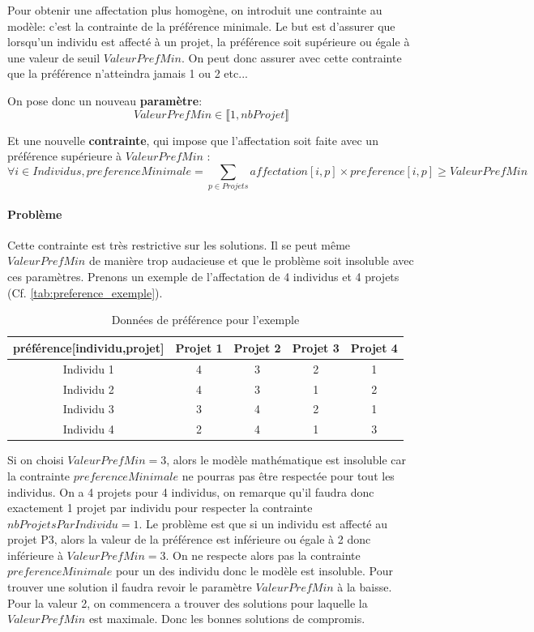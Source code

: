 \documentclass[final,poster]{polytech/polytech}
\begin{document}
Pour obtenir une affectation plus homogène, on introduit une contrainte au modèle: c'est la contrainte de la préférence minimale.
Le but est d'assurer que lorsqu'un individu est affecté à un projet, la préférence soit supérieure ou égale à une valeur de seuil $ValeurPrefMin$.
On peut donc assurer avec cette contrainte que la préférence n'atteindra jamais 1 ou 2 etc...

On pose donc un nouveau \textbf{paramètre}:
$$
ValeurPrefMin \in \llbracket 1,nbProjet \rrbracket
$$

Et une nouvelle \textbf{contrainte}, qui impose que l'affectation soit faite avec un préférence supérieure à $ValeurPrefMin$ :
$$
\forall i \in Individus ,preferenceMinimale = \sum_{p \in Projets} affectation[i,p]\times preference[i,p] \geqslant ValeurPrefMin
$$

\paragraph{Problème} Cette contrainte est très restrictive sur les solutions. Il se peut même $ValeurPrefMin$ de manière trop audacieuse et que le problème soit insoluble avec ces paramètres.
Prenons un exemple de l'affectation de 4 individus et 4 projets (Cf. \autoref{tab:preference_exemple}).

\begin{table}
\caption{\label{tab:preference_exemple}Données de préférence pour l'exemple}
\begin{tabular}{|c|c|c|c|c|}
\hline
préférence[individu,projet] & Projet 1 & Projet 2 & Projet 3 & Projet 4 \\
\hline
Individu 1 & 4 & 3 & 2 & 1 \\
\hline
Individu 2 & 4 & 3 & 1 & 2 \\
\hline
Individu 3 & 3 & 4 & 2 & 1 \\
\hline
Individu 4 & 2 & 4 & 1 & 3 \\
\hline
\end{tabular}
\end{table}

Si on choisi $ValeurPrefMin=3$, alors le modèle mathématique est insoluble car la contrainte $preferenceMinimale$ ne pourras pas être respectée pour tout les individus. On a 4 projets pour 4 individus, on remarque qu'il faudra donc exactement 1 projet par individu pour respecter la contrainte $nbProjetsParIndividu=1$. Le problème est que si un individu est affecté au projet P3, alors la valeur de la préférence est inférieure ou égale à 2 donc inférieure à $ValeurPrefMin=3$. On ne respecte alors pas la contrainte $preferenceMinimale$ pour un des individu donc le modèle est insoluble.
Pour trouver une solution il faudra revoir le paramètre $ValeurPrefMin$ à la baisse. Pour la valeur 2, on commencera a trouver des solutions pour laquelle la $ValeurPrefMin$ est maximale. Donc les bonnes solutions de compromis.
\end{document}
